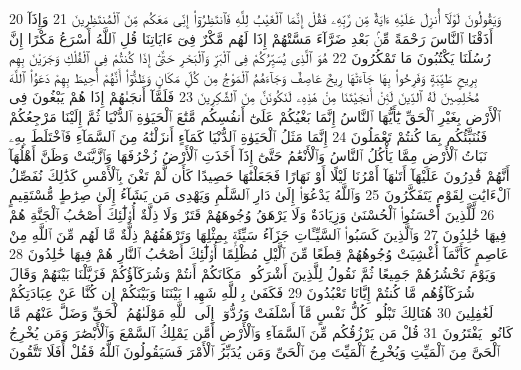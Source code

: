{\tiny\colorbox{cl_aya}{20}} وَيَقُولُونَ لَوْلَآ أُنزِلَ عَلَيْهِ ءَايَةٌ مِّن رَّبِّهِۦ فَقُلْ إِنَّمَا ٱلْغَيْبُ لِلَّهِ فَٱنتَظِرُوٓا۟ إِنِّى مَعَكُم مِّنَ ٱلْمُنتَظِرِينَ
{\tiny\colorbox{cl_aya}{21}} وَإِذَآ أَذَقْنَا ٱلنَّاسَ رَحْمَةً مِّنۢ بَعْدِ ضَرَّآءَ مَسَّتْهُمْ إِذَا لَهُم مَّكْرٌ فِىٓ ءَايَاتِنَا قُلِ ٱللَّهُ أَسْرَعُ مَكْرًا إِنَّ رُسُلَنَا يَكْتُبُونَ مَا تَمْكُرُونَ
{\tiny\colorbox{cl_aya}{22}} هُوَ ٱلَّذِى يُسَيِّرُكُمْ فِى ٱلْبَرِّ وَٱلْبَحْرِ حَتَّىٰٓ إِذَا كُنتُمْ فِى ٱلْفُلْكِ وَجَرَيْنَ بِهِم بِرِيحٍ طَيِّبَةٍ وَفَرِحُوا۟ بِهَا جَآءَتْهَا رِيحٌ عَاصِفٌ وَجَآءَهُمُ ٱلْمَوْجُ مِن كُلِّ مَكَانٍ وَظَنُّوٓا۟ أَنَّهُمْ أُحِيطَ بِهِمْ دَعَوُا۟ ٱللَّهَ مُخْلِصِينَ لَهُ ٱلدِّينَ لَئِنْ أَنجَيْتَنَا مِنْ هَٰذِهِۦ لَنَكُونَنَّ مِنَ ٱلشَّٰكِرِينَ
{\tiny\colorbox{cl_aya}{23}} فَلَمَّآ أَنجَىٰهُمْ إِذَا هُمْ يَبْغُونَ فِى ٱلْأَرْضِ بِغَيْرِ ٱلْحَقِّ يَٰٓأَيُّهَا ٱلنَّاسُ إِنَّمَا بَغْيُكُمْ عَلَىٰٓ أَنفُسِكُم مَّتَٰعَ ٱلْحَيَوٰةِ ٱلدُّنْيَا ثُمَّ إِلَيْنَا مَرْجِعُكُمْ فَنُنَبِّئُكُم بِمَا كُنتُمْ تَعْمَلُونَ
{\tiny\colorbox{cl_aya}{24}} إِنَّمَا مَثَلُ ٱلْحَيَوٰةِ ٱلدُّنْيَا كَمَآءٍ أَنزَلْنَٰهُ مِنَ ٱلسَّمَآءِ فَٱخْتَلَطَ بِهِۦ نَبَاتُ ٱلْأَرْضِ مِمَّا يَأْكُلُ ٱلنَّاسُ وَٱلْأَنْعَٰمُ حَتَّىٰٓ إِذَآ أَخَذَتِ ٱلْأَرْضُ زُخْرُفَهَا وَٱزَّيَّنَتْ وَظَنَّ أَهْلُهَآ أَنَّهُمْ قَٰدِرُونَ عَلَيْهَآ أَتَىٰهَآ أَمْرُنَا لَيْلًا أَوْ نَهَارًا فَجَعَلْنَٰهَا حَصِيدًا كَأَن لَّمْ تَغْنَ بِٱلْأَمْسِ كَذَٰلِكَ نُفَصِّلُ ٱلْءَايَٰتِ لِقَوْمٍ يَتَفَكَّرُونَ
{\tiny\colorbox{cl_aya}{25}} وَٱللَّهُ يَدْعُوٓا۟ إِلَىٰ دَارِ ٱلسَّلَٰمِ وَيَهْدِى مَن يَشَآءُ إِلَىٰ صِرَٰطٍ مُّسْتَقِيمٍ
{\tiny\colorbox{cl_aya}{26}} لِّلَّذِينَ أَحْسَنُوا۟ ٱلْحُسْنَىٰ وَزِيَادَةٌ وَلَا يَرْهَقُ وُجُوهَهُمْ قَتَرٌ وَلَا ذِلَّةٌ أُو۟لَٰٓئِكَ أَصْحَٰبُ ٱلْجَنَّةِ هُمْ فِيهَا خَٰلِدُونَ
{\tiny\colorbox{cl_aya}{27}} وَٱلَّذِينَ كَسَبُوا۟ ٱلسَّيِّـَٔاتِ جَزَآءُ سَيِّئَةٍۭ بِمِثْلِهَا وَتَرْهَقُهُمْ ذِلَّةٌ مَّا لَهُم مِّنَ ٱللَّهِ مِنْ عَاصِمٍ كَأَنَّمَآ أُغْشِيَتْ وُجُوهُهُمْ قِطَعًا مِّنَ ٱلَّيْلِ مُظْلِمًا أُو۟لَٰٓئِكَ أَصْحَٰبُ ٱلنَّارِ هُمْ فِيهَا خَٰلِدُونَ
{\tiny\colorbox{cl_aya}{28}} وَيَوْمَ نَحْشُرُهُمْ جَمِيعًا ثُمَّ نَقُولُ لِلَّذِينَ أَشْرَكُوا۟ مَكَانَكُمْ أَنتُمْ وَشُرَكَآؤُكُمْ فَزَيَّلْنَا بَيْنَهُمْ وَقَالَ شُرَكَآؤُهُم مَّا كُنتُمْ إِيَّانَا تَعْبُدُونَ
{\tiny\colorbox{cl_aya}{29}} فَكَفَىٰ بِٱللَّهِ شَهِيدًۢا بَيْنَنَا وَبَيْنَكُمْ إِن كُنَّا عَنْ عِبَادَتِكُمْ لَغَٰفِلِينَ
{\tiny\colorbox{cl_aya}{30}} هُنَالِكَ تَبْلُوا۟ كُلُّ نَفْسٍ مَّآ أَسْلَفَتْ وَرُدُّوٓا۟ إِلَى ٱللَّهِ مَوْلَىٰهُمُ ٱلْحَقِّ وَضَلَّ عَنْهُم مَّا كَانُوا۟ يَفْتَرُونَ
{\tiny\colorbox{cl_aya}{31}} قُلْ مَن يَرْزُقُكُم مِّنَ ٱلسَّمَآءِ وَٱلْأَرْضِ أَمَّن يَمْلِكُ ٱلسَّمْعَ وَٱلْأَبْصَٰرَ وَمَن يُخْرِجُ ٱلْحَىَّ مِنَ ٱلْمَيِّتِ وَيُخْرِجُ ٱلْمَيِّتَ مِنَ ٱلْحَىِّ وَمَن يُدَبِّرُ ٱلْأَمْرَ فَسَيَقُولُونَ ٱللَّهُ فَقُلْ أَفَلَا تَتَّقُونَ
